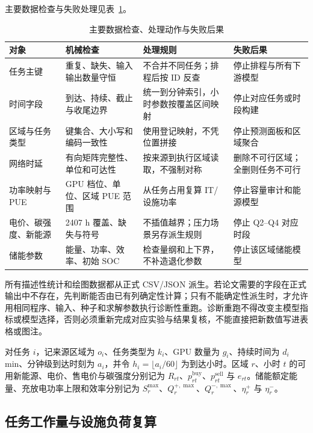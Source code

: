 主要数据检查与失败处理见表~\ref{tab:data-quality}。

\begin{table}[H]
  \centering
  \caption{主要数据检查、处理动作与失败后果}
  \label{tab:data-quality}
  \small
  \begin{tabularx}{\textwidth}{p{}p{}p{}X}
    \toprule
    对象 & 机械检查 & 处理规则 & 失败后果 \\
    \midrule
    任务主键 & 重复、缺失、输入输出数量守恒 & 不合并不同任务；排程后按 ID 反查 & 停止排程与所有下游模型 \\
    时间字段 & 到达、持续、截止与收尾边界 & 统一到分钟索引，小时参数按覆盖区间映射 & 停止对应任务或时段构建 \\
    区域与任务类型 & 键集合、大小写和编码一致性 & 使用登记映射，不凭位置拼接 & 停止预测面板和区域聚合 \\
    网络时延 & 有向矩阵完整性、单位和可达性 & 按来源到执行区域读取，不强制对称 & 删除不可行区域；全删则任务不可行 \\
    功率映射与 PUE & GPU 档位、单位、区域 PUE 范围 & 从任务占用复算 IT/设施功率 & 停止容量审计和能源模型 \\
    电价、碳强度、新能源 & 2407 h 覆盖、缺失与符号 & 不插值越界；压力场景另存派生规则 & 停止 Q2--Q4 对应时段 \\
    储能参数 & 能量、功率、效率、初始 SOC & 检查量纲和上下界，不补造退化参数 & 停止该区域储能模型 \\
    \bottomrule
  \end{tabularx}
\end{table}

所有描述性统计和绘图数据都从正式 CSV/JSON 派生。若论文需要的字段在正式输出中不存在，先判断能否由已有列确定性计算；只有不能确定性派生时，才允许用相同程序、输入、种子和求解参数执行诊断性重跑。诊断重跑不得改变主模型指标或模型选择，否则必须重新完成对应实验与结果复核，不能直接把新数值写进表格或图注。

对任务 $i$，记来源区域为 $o_i$、任务类型为 $k_i$、GPU 数量为 $g_i$、持续时间为 $d_i$ min、分钟级到达时刻为 $a_i$，并令 $h_i=\lfloor a_i/60\rfloor$ 为到达小时。区域 $r$、小时 $t$ 的可用新能源、电价、售电价与碳强度分别记为 $R_{rt}$、$p^{\mathrm{buy}}_{rt}$、$p^{\mathrm{sell}}_{rt}$ 与 $e_{rt}$。储能额定能量、充放电功率上限和效率分别记为 $S_r^{\max}$、$Q_r^{+,\max}$、$Q_r^{-,\max}$、$\eta_r^+$ 与 $\eta_r^-$。

\subsection{任务工作量与设施负荷复算}

